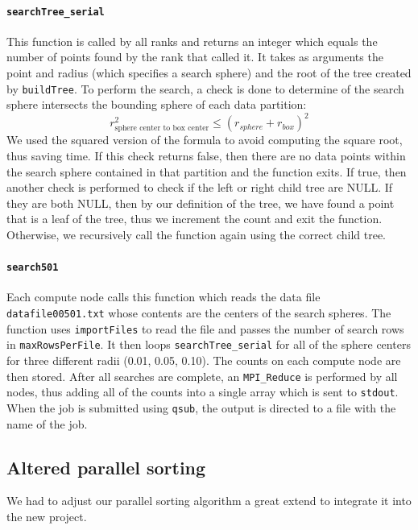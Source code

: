\documentclass{article}
\begin{document}
\paragraph{\texttt{searchTree\_serial}}
This function is called by all ranks and returns an integer which equals the number of points found by the rank that called it. It takes as arguments the point and radius (which specifies a search sphere) and the root of the tree created by \texttt{buildTree}. To perform the search, a check is done to determine of the search sphere intersects the bounding sphere of each data partition:
\begin{equation}
		r^2_\textrm{sphere center to box center} \le (r_{sphere} + r_{box})^2
\end{equation}
We used the squared version of the formula to avoid computing the square root, thus saving time. If this check returns false, then there are no data points within the search sphere contained in that partition and the function exits. If true, then another check is performed to check if the left or right child tree are NULL. If they are both NULL, then by our definition of the tree, we have found a point that is a leaf of the tree, thus we increment the count and exit the function. Otherwise, we recursively call the function again using the correct child tree.

%
%

\paragraph{\texttt{search501}}
%
%

Each compute node calls this function which reads the data file \texttt{datafile00501.txt} whose contents are the centers of the search spheres. The function uses \texttt{importFiles} to read the file and passes the number of search rows in \texttt{maxRowsPerFile}. It then loops \texttt{searchTree\_serial} for all of the sphere centers for three different radii (0.01, 0.05, 0.10). The counts on each compute node are then stored. After all searches are complete, an \texttt{MPI\_Reduce} is performed by all nodes, thus adding all of the counts into a single array which is sent to \texttt{stdout}. When the job is submitted using \texttt{qsub}, the output is directed to a file with the name of the job.


\subsection{Altered parallel sorting}
We had to adjust our parallel sorting algorithm a great extend to integrate it into the new project.
\end{document}
